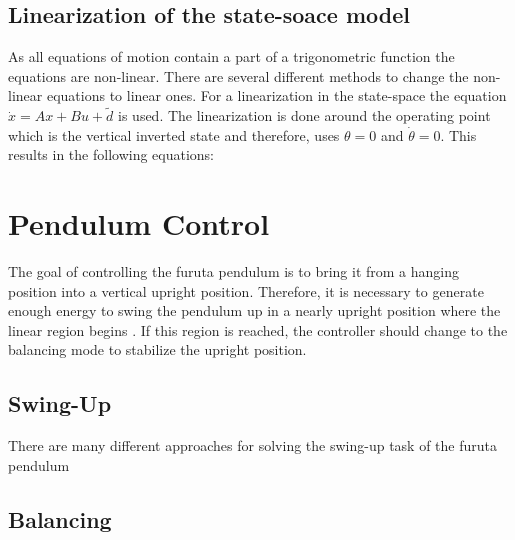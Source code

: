 \subsection{Linearization of the state-soace model}
As all equations of motion contain a part of a trigonometric function the 
equations are non-linear. There are several different methods to change the 
non-linear equations to linear ones. %
 For a linearization in the state-space the equation 
$\dot{x}=Ax+Bu+\tilde{d}$ is used. The linearization is done around the 
operating point \cite{rigatos2018nonlinear} which is the vertical inverted 
state and therefore, uses $\theta = 0$ and $\dot{\theta}=0$. This results in 
the following equations:

\section{Pendulum Control}
The goal of controlling the furuta pendulum is to bring it from a hanging 
position into a vertical upright position. Therefore, it is necessary to 
generate enough energy to swing the pendulum up in a nearly upright position 
where the linear region begins \cite{kurode2011swing}. If this region is 
reached, the controller should change to the balancing mode to stabilize the 
upright position.
\subsection{Swing-Up}
There are many different approaches for solving the swing-up task of the furuta 
pendulum
\subsection{Balancing}

